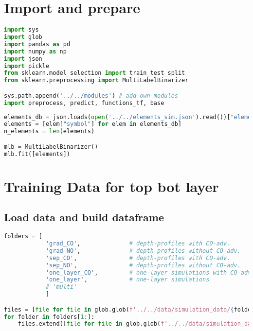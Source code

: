 \hypertarget{import-and-prepare}{%
\section{Import and prepare}\label{import-and-prepare}}

\begin{lstlisting}[language=Python]
import sys
import glob
import pandas as pd
import numpy as np
import json
import pickle
from sklearn.model_selection import train_test_split
from sklearn.preprocessing import MultiLabelBinarizer

sys.path.append('../../modules') # add own modules
import preprocess, predict, functions_tf, base
\end{lstlisting}

\begin{lstlisting}[language=Python]
elements_db = json.loads(open('../../elements_sim.json').read())["elements"]
elements = [elem["symbol"] for elem in elements_db]
n_elements = len(elements)

mlb = MultiLabelBinarizer()
mlb.fit([elements])
\end{lstlisting}

\hypertarget{training-data-for-top-bot-layer}{%
\section{Training Data for top bot
layer}\label{training-data-for-top-bot-layer}}

\hypertarget{load-data-and-build-dataframe}{%
\subsection{Load data and build
dataframe}\label{load-data-and-build-dataframe}}

\begin{lstlisting}[language=Python]
folders = [
            'grad_CO',              # depth-profiles with CO-adv.       with gradient layers
            'grad_NO',              # depth-profiles without CO-adv.    with gradient layers
            'sep_CO',               # depth-profiles with CO-adv.       with separated layers
            'sep_NO',               # depth-profiles without CO-adv.    with separated layers
            'one_layer_CO',         # one-layer simulations with CO-adv.
            'one_layer',            # one-layer simulations
            # 'multi'
            ]

files = [file for file in glob.glob(f'../../data/simulation_data/{folders[0]}/*.spc')]
for folder in folders[1:]:
    files.extend([file for file in glob.glob(f'../../data/simulation_data/{folder}/*.spc')])
\end{lstlisting}

